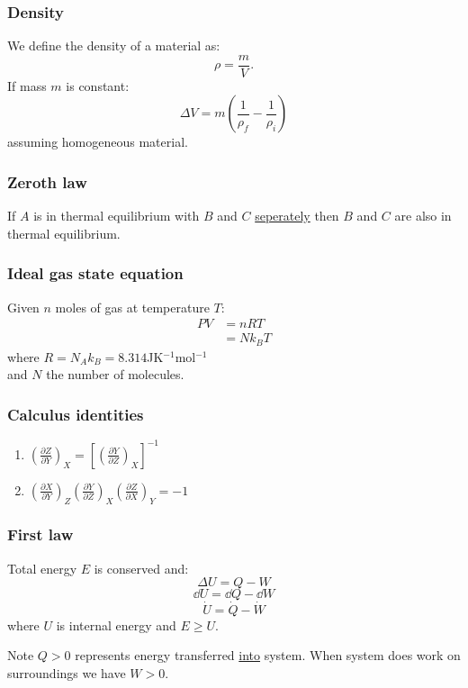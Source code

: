 \documentclass{article}
\begin{document}
\begin{multicols*}{3}
\subsubsection*{Density}
We define the density of a material as:
$$\rho=\frac{m}{V}.$$
If mass $m$ is constant:
$$\Delta V=m\left(\frac{1}{\rho_f}
-\frac{1}{\rho_i}\right)$$
assuming homogeneous material.

\subsubsection*{Zeroth law}
If $A$ is in thermal equilibrium with $B$ and $C$
\underline{seperately} then $B$ and $C$
are also in thermal equilibrium.

\subsubsection*{Ideal gas state equation}
Given $n$ moles of gas at temperature $T$:
\begin{align*}
    PV&=nRT \\
    &=Nk_B T
\end{align*}
where $R=N_A k_B=8.314$JK$^{-1}$mol$^{-1}$ \\
and $N$ the number of molecules.

\subsubsection*{Calculus identities}
\begin{enumerate}
    \item $\displaystyle
    \left(\frac{\partial Z}{\partial Y}\right)_X
    =\left[\left(\frac{\partial Y}{\partial Z}\right)_X
    \right]^{-1}$

    \item $\displaystyle
    \left(\frac{\partial X}{\partial Y}\right)_Z
    \left(\frac{\partial Y}{\partial Z}\right)_X
    \left(\frac{\partial Z}{\partial X}\right)_Y
    =-1$
\end{enumerate}

\subsubsection*{First law}
Total energy $E$ is conserved and:
$$\Delta U=Q-W$$
$$\dd U=\dd Q-\dd W$$
$$\dot{U}=\dot{Q}-\dot{W}$$
where $U$ is internal energy and $E\geq U$.

Note $Q>0$ represents energy transferred
\underline{into} system.
When system does work on surroundings
we have $W>0$.


\end{multicols*}
\end{document}

